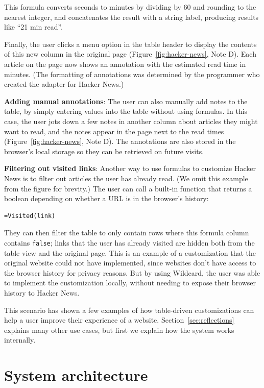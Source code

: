 \documentclass[sigplan,screen,10pt,anonymous,review]{acmart}
\begin{document}
This formula converts seconds to minutes by dividing by 60 and rounding
to the nearest integer, and concatenates the result with a string label,
producing results like ``21 min read''.

Finally, the user clicks a menu option in the table header to display
the contents of this new column in the original page
(Figure~\ref{fig:hacker-news}, Note D). Each article on the page now
shows an annotation with the estimated read time in minutes. (The
formatting of annotations was determined by the programmer who created
the adapter for Hacker News.)

\textbf{Adding manual annotations}: The user can also manually add notes
to the table, by simply entering values into the table without using
formulas. In this case, the user jots down a few notes in another column
about articles they might want to read, and the notes appear in the page
next to the read times (Figure~\ref{fig:hacker-news}, Note D). The
annotations are also stored in the browser's local storage so they can
be retrieved on future visits.

\textbf{Filtering out visited links}: Another way to use formulas to
customize Hacker News is to filter out articles the user has already
read. (We omit this example from the figure for brevity.) The user can
call a built-in function that returns a boolean depending on whether a
URL is in the browser's history:

\begin{verbatim}
=Visited(link)
\end{verbatim}

They can then filter the table to only contain rows where this formula
column contains \texttt{false}; links that the user has already visited
are hidden both from the table view and the original page. This is an
example of a customization that the original website could not have
implemented, since websites don't have access to the browser history for
privacy reasons. But by using Wildcard, the user was able to implement
the customization locally, without needing to expose their browser
history to Hacker News.

This scenario has shown a few examples of how table-driven
customizations can help a user improve their experience of a website.
Section~\ref{sec:reflections} explains many other use cases, but first
we explain how the system works internally.

\hypertarget{sec:architecture}{%
\section{System architecture}\label{sec:architecture}}
\end{document}
